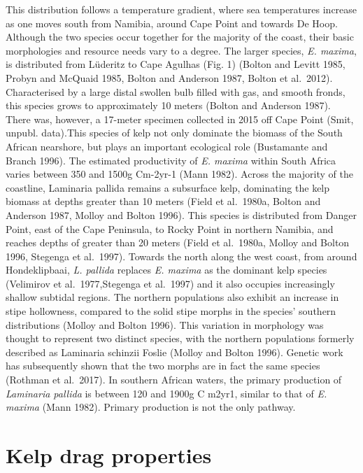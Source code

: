 \documentclass[]{article}
\begin{document}
This distribution follows a temperature gradient, where sea temperatures
increase as one moves south from Namibia, around Cape Point and towards
De Hoop. Although the two species occur together for the majority of the
coast, their basic morphologies and resource needs vary to a degree. The
larger species, \emph{E. maxima}, is distributed from Lüderitz to Cape
Agulhas (Fig. 1) (Bolton and Levitt 1985, Probyn and McQuaid 1985,
Bolton and Anderson 1987, Bolton et al.~2012). Characterised by a large
distal swollen bulb filled with gas, and smooth fronds, this species
grows to approximately 10 meters (Bolton and Anderson 1987). There was,
however, a 17-meter specimen collected in 2015 off Cape Point (Smit,
unpubl. data).This species of kelp not only dominate the biomass of the
South African nearshore, but plays an important ecological role
(Bustamante and Branch 1996). The estimated productivity of \emph{E.
maxima} within South Africa varies between 350 and 1500g Cm-2yr-1 (Mann
1982). Across the majority of the coastline, Laminaria pallida remains a
subsurface kelp, dominating the kelp biomass at depths greater than 10
meters (Field et al.~1980a, Bolton and Anderson 1987, Molloy and Bolton
1996). This species is distributed from Danger Point, east of the Cape
Peninsula, to Rocky Point in northern Namibia, and reaches depths of
greater than 20 meters (Field et al.~1980a, Molloy and Bolton 1996,
Stegenga et al.~1997). Towards the north along the west coast, from
around Hondeklipbaai, \emph{L. pallida} replaces \emph{E. maxima} as the
dominant kelp species (Velimirov et al.~1977,Stegenga et al.~1997) and
it also occupies increasingly shallow subtidal regions. The northern
populations also exhibit an increase in stipe hollowness, compared to
the solid stipe morphs in the species' southern distributions (Molloy
and Bolton 1996). This variation in morphology was thought to represent
two distinct species, with the northern populations formerly described
as Laminaria schinzii Foslie (Molloy and Bolton 1996). Genetic work has
subsequently shown that the two morphs are in fact the same species
(Rothman et al.~2017). In southern African waters, the primary
production of \emph{Laminaria pallida} is between 120 and 1900g C m2yr1,
similar to that of \emph{E. maxima} (Mann 1982). Primary production is
not the only pathway.

\hypertarget{kelp-drag-properties}{%
\section{Kelp drag properties}\label{kelp-drag-properties}}
\end{document}
